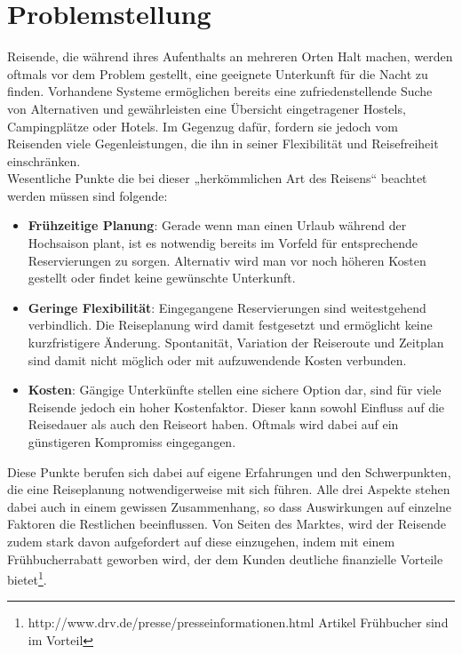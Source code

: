 
\section{Problemstellung}
Reisende, die während ihres Aufenthalts an mehreren Orten Halt machen, werden oftmals vor dem Problem gestellt, eine geeignete Unterkunft für die Nacht zu finden. Vorhandene Systeme ermöglichen bereits eine zufriedenstellende Suche von Alternativen und gewährleisten eine Übersicht eingetragener Hostels, Campingplätze oder Hotels. Im Gegenzug dafür, fordern sie jedoch vom Reisenden viele Gegenleistungen, die ihn in seiner Flexibilität und Reisefreiheit einschränken.\\
Wesentliche Punkte die bei dieser „herkömmlichen Art des Reisens“ beachtet werden müssen sind folgende:
\begin{itemize}
   \item \textbf{Frühzeitige Planung}: Gerade wenn man einen Urlaub während der Hochsaison plant, ist es notwendig bereits im Vorfeld für entsprechende Reservierungen zu sorgen. Alternativ wird man vor noch höheren Kosten gestellt oder findet keine gewünschte Unterkunft. 
   \item \textbf{Geringe Flexibilität}: Eingegangene Reservierungen sind weitestgehend verbindlich. Die Reiseplanung wird damit festgesetzt und ermöglicht keine kurzfristigere Änderung. Spontanität, Variation der Reiseroute und Zeitplan sind damit nicht möglich oder mit aufzuwendende Kosten verbunden. 
   \item \textbf{Kosten}: Gängige Unterkünfte stellen eine sichere Option dar, sind für viele Reisende jedoch ein hoher Kostenfaktor. Dieser kann sowohl Einfluss auf die Reisedauer als auch den Reiseort haben. Oftmals wird dabei auf ein günstigeren Kompromiss eingegangen. 
\end{itemize}

Diese Punkte berufen sich dabei auf eigene Erfahrungen und den Schwerpunkten, die eine Reiseplanung notwendigerweise mit sich führen. Alle drei Aspekte stehen dabei auch in einem gewissen Zusammenhang, so dass Auswirkungen auf einzelne Faktoren die Restlichen beeinflussen. Von Seiten des Marktes, wird der Reisende zudem stark davon aufgefordert auf diese einzugehen, indem mit einem Frühbucherrabatt geworben wird, der dem Kunden deutliche finanzielle Vorteile bietet\footnote{ http://www.drv.de/presse/presseinformationen.html Artikel Frühbucher sind im Vorteil}.\\    

